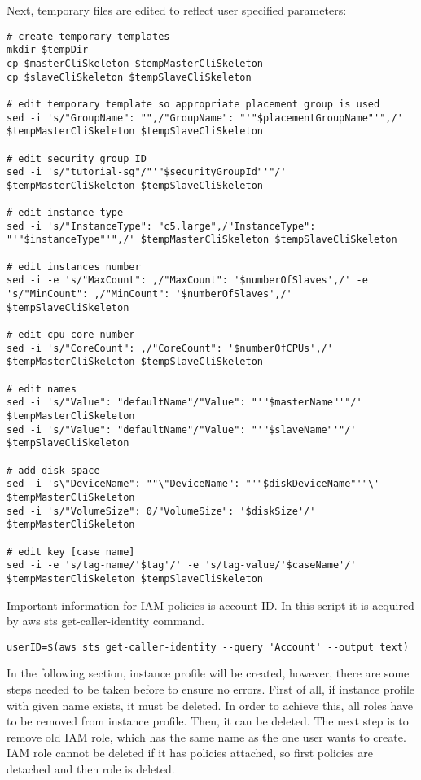 \documentclass[11pt,english]{article}
\begin{document}
Next, temporary files are edited to reflect user specified parameters:
\begin{lstlisting}
# create temporary templates
mkdir $tempDir
cp $masterCliSkeleton $tempMasterCliSkeleton
cp $slaveCliSkeleton $tempSlaveCliSkeleton

# edit temporary template so appropriate placement group is used
sed -i 's/"GroupName": "",/"GroupName": "'"$placementGroupName"'",/' $tempMasterCliSkeleton $tempSlaveCliSkeleton

# edit security group ID
sed -i 's/"tutorial-sg"/"'"$securityGroupId"'"/' $tempMasterCliSkeleton $tempSlaveCliSkeleton

# edit instance type
sed -i 's/"InstanceType": "c5.large",/"InstanceType": "'"$instanceType"'",/' $tempMasterCliSkeleton $tempSlaveCliSkeleton

# edit instances number
sed -i -e 's/"MaxCount": ,/"MaxCount": '$numberOfSlaves',/' -e 's/"MinCount": ,/"MinCount": '$numberOfSlaves',/' $tempSlaveCliSkeleton

# edit cpu core number
sed -i 's/"CoreCount": ,/"CoreCount": '$numberOfCPUs',/' $tempMasterCliSkeleton $tempSlaveCliSkeleton

# edit names
sed -i 's/"Value": "defaultName"/"Value": "'"$masterName"'"/' $tempMasterCliSkeleton
sed -i 's/"Value": "defaultName"/"Value": "'"$slaveName"'"/' $tempSlaveCliSkeleton

# add disk space
sed -i 's\"DeviceName": ""\"DeviceName": "'"$diskDeviceName"'"\' $tempMasterCliSkeleton
sed -i 's/"VolumeSize": 0/"VolumeSize": '$diskSize'/' $tempMasterCliSkeleton

# edit key [case name]
sed -i -e 's/tag-name/'$tag'/' -e 's/tag-value/'$caseName'/' $tempMasterCliSkeleton $tempSlaveCliSkeleton
\end{lstlisting}
Important information for IAM policies is account ID. In this script it is acquired by aws sts get-caller-identity command.
\begin{lstlisting}
userID=$(aws sts get-caller-identity --query 'Account' --output text)
\end{lstlisting}
In the following section, instance profile will be created, however, there are some steps needed to be taken before to ensure no errors. First of all, if instance profile with given name exists, it must be deleted. In order to achieve this, all roles have to be removed from instance profile. Then, it can be deleted. The next step is to remove old IAM role, which has the same name as the one user wants to create. IAM role cannot be deleted if it has policies attached, so first policies are detached and then role is deleted. 
\end{document}
